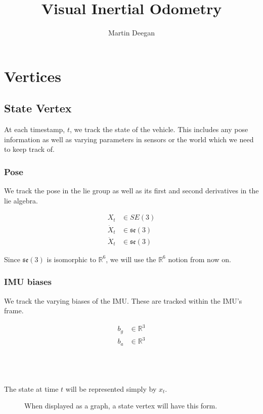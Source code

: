 \documentclass[11pt]{article}
\title{Visual Inertial Odometry}
\author{Martin Deegan}
\newcommand{\R}{\mathbb{R}}
\begin{document}
 
\maketitle
\tableofcontents

\section{Vertices}
\subsection{State Vertex}
At each timestamp, $t$, we track the state of the vehicle. This includes any pose information as well as varying parameters in sensors or the world which we need to keep track of.




\subsubsection{Pose}
We track the pose in the lie group as well as its first and second derivatives in the lie algebra.

\begin{align}
	X_t &\in SE(3)\\
	\dot X_t &\in \mathfrak{se}(3)\\
	\ddot X_t &\in \mathfrak{se}(3)
\end{align}

Since $\mathfrak{se}(3)$ is isomorphic to $\R^6$, we will use the $\R^6$ notion from now on.

\subsubsection{IMU biases}
We track the varying biases of the IMU. These are tracked within the IMU's frame.

\begin{align}
	b_g &\in \R^3\\
	b_a &\in \R^3
\end{align}

~\\\\\\

The state at time $t$ will be represented simply by $x_t$.
\begin{figure}[H]
	\centering
	\caption{When displayed as a graph, a state vertex will have this form.}
\end{figure}
\end{document}
